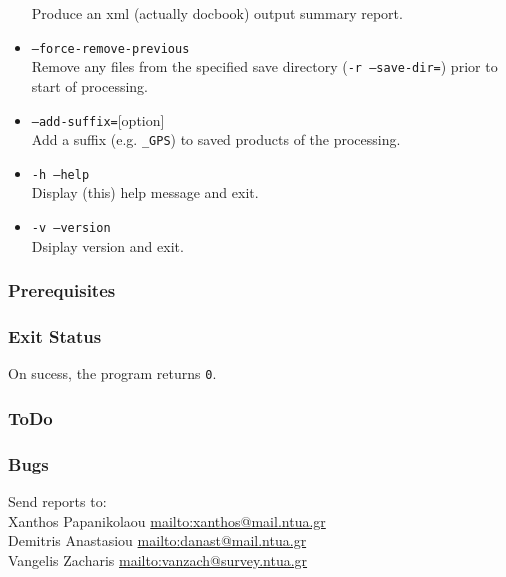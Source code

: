 \begin{itemize}
Produce an xml (actually docbook) output summary report.
\item \texttt{--force-remove-previous}\\
Remove any files from the specified save directory (\texttt{-r --save-dir=}) prior to start 
of processing.
\item \texttt{--add-suffix=}[option]\\
Add a suffix (e.g. \texttt{\_GPS}) to saved products of the processing.
\item \texttt{-h --help}\\
Display (this) help message and exit.
\item \texttt{-v --version}\\
Dsiplay version and exit.
\end{itemize}


\subsubsection{Prerequisites}


\subsubsection{Exit Status}
On sucess, the program returns \texttt{0}.

\subsubsection{ToDo}

\subsubsection{Bugs}
Send reports to:\\
Xanthos Papanikolaou \href{mailto:xanthos@mail.ntua.gr}{mailto:xanthos@mail.ntua.gr}\\
Demitris Anastasiou  \href{mailto:danast@mail.ntua.gr}{mailto:danast@mail.ntua.gr}\\
Vangelis Zacharis  \href{mailto:vanzach@survey.ntua.gr}{mailto:vanzach@survey.ntua.gr}\\
\bigskip


